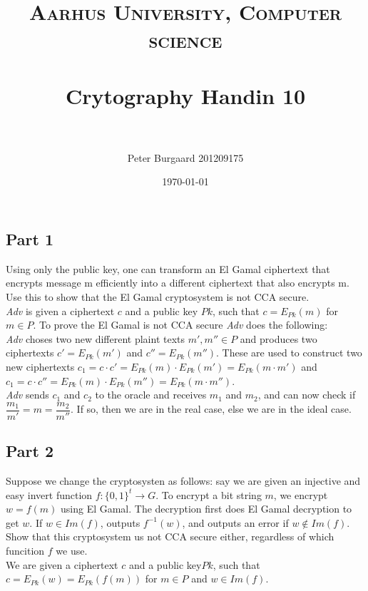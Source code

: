 \documentclass[paper=a4, fontsize=11pt]{scrartcl} %
\title{	
	\normalfont \normalsize 
	\textsc{Aarhus University, Computer science} \\ [25pt] %
	\horrule{0.5pt} \\[0.4cm] %
	\huge Crytography Handin 10 \\ %
	\horrule{2pt} \\[0.5cm] %
}
\author{Peter Burgaard 201209175} %
\date{\normalsize\today} %
\numberwithin{equation}{section} %
\numberwithin{figure}{section} %
\numberwithin{table}{section} %
\begin{document}
	
	\maketitle %
	
	\subsection*{Part 1}
	
	Using only the public key, one can transform an El Gamal ciphertext that encrypts message m efficiently into a different ciphertext that also encrypts m. Use this to show that the El Gamal cryptosystem is not CCA secure. \\ 
	
	\textit{Adv} is given a ciphertext $c$ and a public key $Pk$, such that $c=E_{Pk}(m)$ for $m\in P$. To prove the El Gamal is not CCA secure \textit{Adv} does the following: \\ 
	
	 \textit{Adv} choses two new different plaint texts $m', m''\in P$ and produces two ciphertexts $c'=E_{Pk}(m')$ and $c''=E_{Pk}(m'')$. These are used to construct two new ciphertexts $c_1=c\cdot c'=E_{Pk}(m)\cdot E_{Pk}(m')=E_{Pk}(m\cdot m')$ and $c_1=c\cdot c''=E_{Pk}(m)\cdot E_{Pk}(m'')=E_{Pk}(m\cdot m'')$. \\
	 
	 \textit{Adv} sends $c_1$ and $c_2$ to the oracle and receives $m_1$ and $m_2$, and can now check if $\dfrac{m_1}{m'}=m=\dfrac{m_2}{m''}$. If so, then we are in the real case, else we are in the ideal case.
	 
	 \subsection*{Part 2}
	 
	 Suppose we change the cryptosysten as follows: say we are given an injective and easy invert function $f:\{  0,1\} ^t\rightarrow G$. To encrypt a bit string $m$, we encrypt $w=f(m)$ using El Gamal. The decryption first does El Gamal decryption to get $w$. If $w\in Im(f)$, outputs $f^{-1}(w)$, and outputs an error if $w\not\in Im(f)$. \\
	 
	Show that this cryptosystem us not CCA secure either, regardless of which funcition $f$ we use. \\
	
	We are given a ciphertext $c$ and a public key$Pk$, such that $c=E_{Pk}(w)=E_{Pk}(f(m))$ for $m\in P$ and $w\in Im(f)$. \\ 
	
\end{document}
